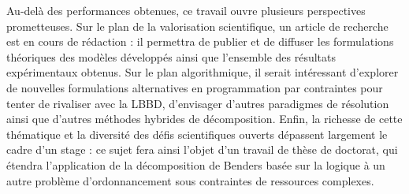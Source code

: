 \bigskip

Au-delà des performances obtenues, ce travail ouvre plusieurs perspectives prometteuses. Sur le plan de la valorisation scientifique, un article de recherche est en cours de rédaction : il permettra de publier et de diffuser les formulations théoriques des modèles développés ainsi que l'ensemble des résultats expérimentaux obtenus. Sur le plan algorithmique, il serait intéressant d'explorer de nouvelles formulations alternatives en programmation par contraintes pour tenter de rivaliser avec la LBBD, d'envisager d'autres paradigmes de résolution ainsi que d'autres méthodes hybrides de décomposition. Enfin, la richesse de cette thématique et la diversité des défis scientifiques ouverts dépassent largement le cadre d'un stage : ce sujet fera ainsi l'objet d'un travail de thèse de doctorat, qui étendra l'application de la décomposition de Benders basée sur la logique à un autre problème d'ordonnancement sous contraintes de ressources complexes.
